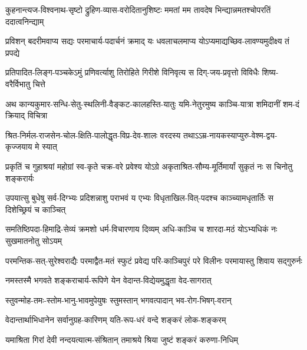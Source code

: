 \twolineshloka
{कुहनान्त्यज-विश्वनाथ-सृष्टो द्रुहिण-व्यास-वरोदितानुशिष्टः}
{ममतां मम तावदेष भिन्द्यान्नमतश्चोपरतिं ददात्वनिन्द्याम्}

\twolineshloka
{प्रविशन् बदरीमवाप्य सद्यः परमाचार्य-पदार्चनं क्रमाद् यः}
{धवलाचलमाप्य योऽप्यमाद्यच्छिव-लावण्यमुदीक्ष्य तं प्रपद्ये}

\twolineshloka
{प्रतिपादित-लिङ्ग-पञ्चकेऽमुं प्रणिवर्त्याशु तिरोहिते गिरीशे}
{विनिवृत्य स दिग्-जय-प्रवृत्तो विविधैः शिष्य-वरैर्विभातु चित्ते}

\twolineshloka
{अथ कान्यकुमार-सन्धि-सेतु-स्थलिनी-वैङ्कट-कालहस्ति-यातुः}
{यमि-नेतुरमुष्य काञ्चि-यात्रा शमिदानीं शम-दं क्रियाद् विचित्रा}

\twolineshloka
{श्रित-निर्मल-राजसेन-चोल-क्षिति-पालोद्धृत-विप्र-देव-शालः}
{वरदस्य तथाऽऽम्र-नायकस्याप्युरु-वेश्म-द्वय-कृज्जयाय मे स्यात्}

\twolineshloka
{प्रकृतिं च गुहाश्रयां महोग्रां स्व-कृते चक्र-वरे प्रवेश्य योऽग्रे}
{अकृताश्रित-सौम्य-मूर्तिमार्यां सुकृतं नः स चिनोतु शङ्करार्यः}

\twolineshloka
{उपयात्सु बुधेषु सर्व-दिग्भ्यः प्रदिशन्नाशु पराभवं य एभ्यः}
{विधृताखिल-वित्-पदश्च काञ्च्यामधृतार्तिः स दिशेच्छ्रियं च काञ्चित्}

\twolineshloka
{समतिष्ठिपदा-हिमाद्रि-सेव्यं क्रमशो धर्म-विचारणाय दिव्यम्}
{अधि-काञ्चि च शारदा-मठं योऽभ्यधिकं नः सुखमातनोतु सोऽयम्}

\twolineshloka
{परमन्तिक-सत्-सुरेश्वराद्यैः परमाद्वैत-मतं स्फुटं प्रवेद्य}
{परि-काञ्चिपुरं परे विलीनः परमायास्तु शिवाय सद्गुरुर्नः}



\twolineshloka
{नमस्तस्मै भगवते शङ्कराचार्य-रूपिणे}
{येन वेदान्त-विद्येयमुद्धृता वेद-सागरात्}


\twolineshloka
{स्तुवन्मोह-तमः-स्तोम-भानु-भावमुपेयुषः}
{स्तुमस्तान् भगवत्पादान् भव-रोग-भिषग्-वरान्}


\twolineshloka
{वेदान्तार्थाभिधानेन सर्वानुग्रह-कारिणम्}
{यति-रूप-धरं वन्दे शङ्करं लोक-शङ्करम्}


\twolineshloka
{यमाश्रिता गिरां देवी नन्दयत्यात्म-संश्रितान्}
{तमाश्रये श्रिया जुष्टं शङ्करं करुणा-निधिम्}

